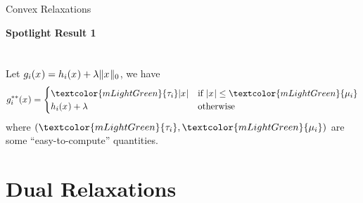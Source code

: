 \documentclass[10pt]{beamer}
\begin{document}
\begin{frame}{Convex Relaxations}
  \begin{center}
    \textbf{Spotlight Result 1} \\
    \\~\\
    Let $g_{i}(x_{}) = h_{i}(x_{}) + \lambda\|x_{}\|_0$, we have
    \begin{equation*}
      \biconj{\separable{\rfunc}{\idxentry}}(\pvi{}) = 
      \begin{cases}
        \textcolor{mLightGreen}{\separable{\pertslope}{\idxentry}}\abs{\pvi{}} &\text{if } \abs{\pvi{}} \leq \textcolor{mLightGreen}{\separable{\pertlimit}{\idxentry}} \\
        \separable{\pfunc}{\idxentry}(\pvi{}) + \reg &\text{otherwise}
      \end{cases}
    \end{equation*}
    where $(\textcolor{mLightGreen}{\separable{\pertslope}{\idxentry}},\textcolor{mLightGreen}{\separable{\pertlimit}{\idxentry}})$ are some ``easy-to-compute'' quantities.
  \end{center}

\end{frame}

\section{Dual Relaxations}
\end{document}

